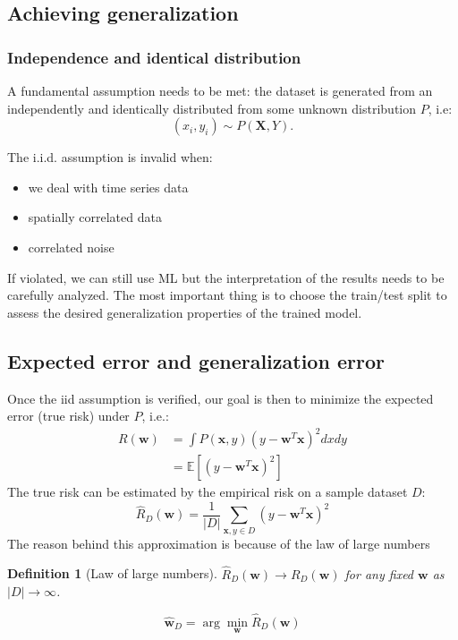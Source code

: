 \documentclass[a4paper,10pt,twoside]{article}
\newtheorem{definition}{Definition}[section]
\begin{document}
\subsection{Achieving generalization}
\subsubsection{Independence and identical distribution}
A fundamental assumption needs to be met: the dataset is generated from an independently and identically distributed from some unknown distribution $P$, i.e:
\begin{equation*}
    (x_i, y_i)\sim P(\mathbf{X},Y).
\end{equation*}

The i.i.d. assumption is invalid when:
\begin{itemize}
    \item we deal with time series data
    \item spatially correlated data
    \item correlated noise
\end{itemize}
If violated, we can still use ML but the interpretation of the results needs to be carefully analyzed. The most important thing is to choose the train/test split to assess the desired generalization properties of the trained model. 

\subsection{Expected error and generalization error}
Once the iid assumption is verified, our goal is then to minimize the expected error (true risk) under $P$, i.e.:
\begin{align*}
    R(\mathbf{w})&=\int P(\mathbf{x},y)(y-\mathbf{w}^T\mathbf{x})^2dxdy\\
    & =\mathbb{E}[(y-\mathbf{w}^T\mathbf{x})^2]
\end{align*}
The true risk can be estimated by the empirical risk on a sample dataset $D$:
\begin{equation*}
    \hat{R}_D(\mathbf{w})=\frac{1}{|D|}\sum_{\mathbf{x}, y\in D}(y-\mathbf{w}^T\mathbf{x})^2
\end{equation*}
The reason behind this approximation is because of the law of large numbers
\begin{definition}[Law of large numbers]
    $\hat{R}_D(\mathbf{w})\rightarrow R_D(\mathbf{w})$ for any fixed $\mathbf{w}$ as $|D|\rightarrow\infty$.
\end{definition}
\begin{equation}
    \label{empirical_risk}
    \mathbf{\hat{w}}_D=\arg\min_{\mathbf{w}}\hat{R}_D(\mathbf{w})
\end{equation}
\end{document}
